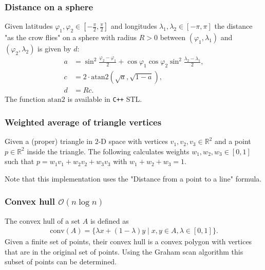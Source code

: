 \subsubsection{Distance on a sphere}
Given latitudes $\varphi_1, \varphi_2 \in [-\frac\pi2, \frac\pi2]$ and longitudes $\lambda_1, \lambda_2 \in [-\pi, \pi]$ the distance "as the crow flies" on a sphere with radius $R > 0$ between $(\varphi_1, \lambda_1)$ and $(\varphi_2, \lambda_2)$ is given by $d$:
\begin{align*}
    a &= \sin^2\frac{\varphi_2 - \varphi_1}2 + \cos\varphi_1 \cos\varphi_2 \sin^2\frac{\lambda_2 - \lambda_1}2, \\
    c &= 2\cdot\text{atan2}(\sqrt a, \sqrt{1 - a}), \\
    d &= Rc.
\end{align*}
The function $\text{atan2}$ is available in \texttt{C++} STL.


\subsubsection{Weighted average of triangle vertices}
Given a (proper) triangle in $2$-D space with vertices $v_1, v_2, v_3 \in \mathbb R^2$ and a point $p \in \mathbb R^2$ inside the triangle. The following calculates weights $w_1, w_2, w_3 \in [0, 1]$ such that $p = w_1v_1 + w_2v_2 + w_3v_3$ with $w_1 + w_2 + w_3 = 1$.

Note that this implementation uses the "Distance from a point to a line" formula.

\subsubsection{Convex hull $\mathcal O(n \log n)$}
The convex hull of a set $A$ is defined as
\begin{align*}
    \text{conv}(A) = \{\lambda x + (1 - \lambda) y \mid x, y \in A, \lambda \in [0, 1]\}.
\end{align*}
Given a finite set of points, their convex hull is a convex polygon with vertices that are in the original set of points. Using the Graham scan algorithm this subset of points can be determined.



